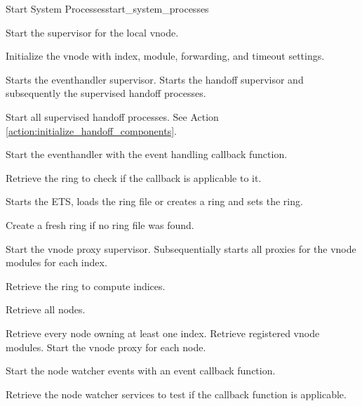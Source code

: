 \begin{actionbox}{Start System Processes}{start_system_processes}
	\begin{action}
		 Start the supervisor for the local vnode.
		\begin{action}
			 Initialize the vnode with index, module, forwarding, and timeout settings.
		\end{action}
		 Starts the eventhandler supervisor.
		 Starts the handoff supervisor and subsequently the supervised handoff processes.
		\begin{action}
			 Start all supervised handoff processes.
			See Action \ref{action:initialize_handoff_components}.
		\end{action}
		 Start the eventhandler with the event handling callback function.
		\begin{action}
			 Retrieve the ring to check if the callback is applicable to it.
		\end{action}
		 Starts the ETS, loads the ring file or creates a ring and sets the ring.
		\begin{action}
			 Create a fresh ring if no ring file was found.
		\end{action}
		 Start the vnode proxy supervisor.
		Subsequentially starts all proxies for the vnode modules for each index.
		\begin{action}
			 Retrieve the ring to compute indices.
			\begin{action}
				 Retrieve all nodes.
			\end{action}
			 Retrieve every node owning at least one index.
			 Retrieve registered vnode modules.
			 Start the vnode proxy for each node.
		\end{action}
		 Start the node watcher events with an event callback function.
		\begin{action}
			 Retrieve the node watcher services to test if the callback function is applicable.

\end{action}
\end{action}
\end{actionbox}
